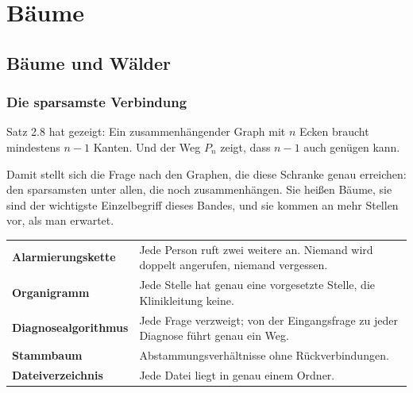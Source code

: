 \part{Bäume}

\chapter{Bäume und Wälder}

\section{Die sparsamste Verbindung}

Satz 2.8 hat gezeigt: Ein zusammenhängender Graph mit $n$ Ecken braucht mindestens $n-1$ Kanten. Und der Weg $P_n$ zeigt, dass $n-1$ auch genügen kann.

Damit stellt sich die Frage nach den Graphen, die diese Schranke genau erreichen: den sparsamsten unter allen, die noch zusammenhängen. Sie heißen Bäume, sie sind der wichtigste Einzelbegriff dieses Bandes, und sie kommen an mehr Stellen vor, als man erwartet.

\begin{merksatz}
\begin{center}
{\small
\renewcommand{\arraystretch}{1.45}
\begin{tabular}{@{}P{3.0cm}P{5.4cm}@{}}
\toprule
\textbf{Alarmierungs\-kette} & Jede Person ruft zwei weitere an. Niemand wird doppelt angerufen, niemand vergessen.\\
\textbf{Organigramm} & Jede Stelle hat genau eine vorgesetzte Stelle, die Klinikleitung keine.\\
\textbf{Diagnose\-algorithmus} & Jede Frage verzweigt; von der Eingangsfrage zu jeder Diagnose führt genau ein Weg.\\
\textbf{Stammbaum} & Abstammungsverhältnisse ohne Rückverbindungen.\\
\textbf{Datei\-verzeichnis} & Jede Datei liegt in genau einem Ordner.\\
\bottomrule
\end{tabular}}
\end{center}

\begin{center}
\begin{minipage}{0.88\textwidth}
\end{minipage}
\end{center}
\end{merksatz}

